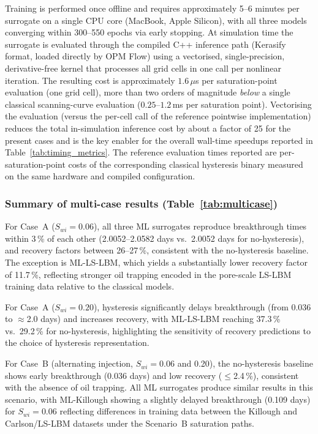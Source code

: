 Training is performed once offline and requires approximately 5--6 minutes
per surrogate on a single CPU core (MacBook, Apple Silicon), with all three
models converging within 300--550 epochs via early stopping.
At simulation time the surrogate is evaluated through the compiled C++
inference path (Kerasify format, loaded directly by OPM Flow) using a
vectorised, single-precision, derivative-free kernel that processes all grid
cells in one call per nonlinear iteration. The resulting cost is
approximately $1.6\,\mu$s per saturation-point evaluation (one grid cell),
more than two orders of magnitude \emph{below} a single classical
scanning-curve evaluation ($0.25$--$1.2$\,ms per saturation point).
Vectorising the evaluation (versus the per-cell call of the reference
pointwise implementation) reduces the total in-simulation inference cost by
about a factor of 25 for the present cases and is the key enabler for the
overall wall-time speedups reported in Table~\ref{tab:timing_metrics}.
The reference evaluation times reported are per-saturation-point costs
of the corresponding classical hysteresis binary measured on the same
hardware and compiled configuration.

\subsubsection*{Summary of multi-case results (Table~\ref{tab:multicase})}

For Case~A ($S_{wi}=0.06$), all three ML surrogates reproduce breakthrough
times within 3\,\% of each other (2.0052--2.0582 days vs.\ 2.0052 days
for no-hysteresis), and recovery factors between 26--27\,\%, consistent
with the no-hysteresis baseline.
The exception is ML-LS-LBM, which yields a substantially lower recovery
factor of 11.7\,\%, reflecting stronger oil trapping encoded in the
pore-scale LS-LBM training data relative to the classical models.

For Case~A ($S_{wi}=0.20$), hysteresis significantly delays breakthrough
(from 0.036 to $\approx$2.0 days) and increases recovery, with
ML-LS-LBM reaching 37.3\,\% vs.\ 29.2\,\% for no-hysteresis, highlighting
the sensitivity of recovery predictions to the choice of hysteresis
representation.

For Case~B (alternating injection, $S_{wi}=0.06$ and 0.20), the
no-hysteresis baseline shows early breakthrough (0.036 days) and low
recovery ($\leq$2.4\,\%), consistent with the absence of oil trapping.
All ML surrogates produce similar results in this scenario, with
ML-Killough showing a slightly delayed breakthrough (0.109 days) for
$S_{wi}=0.06$ reflecting differences in training data between the
Killough and Carlson/LS-LBM datasets under the Scenario~B saturation
paths.
